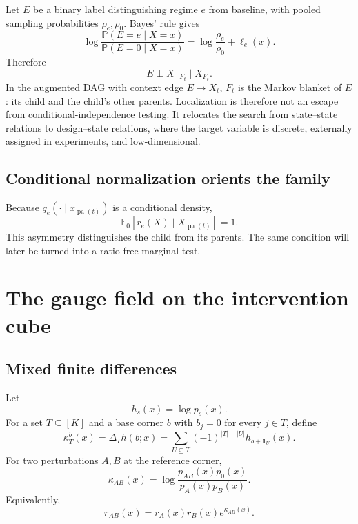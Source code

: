\documentclass[11pt]{article}
\newcommand{\E}{\mathbb{E}}
\newcommand{\Pp}{\mathbb{P}}
\newcommand{\pa}{\operatorname{pa}}
\begin{document}
Let \(E\) be a binary label distinguishing regime \(e\) from baseline, with pooled sampling probabilities \(\rho_e,\rho_0\).  Bayes' rule gives
\begin{equation}
\log\frac{\Pp(E=e\mid X=x)}{\Pp(E=0\mid X=x)}
=
\log\frac{\rho_e}{\rho_0}+\ell_e(x).
\label{eq:classifier-ratio}
\end{equation}
Therefore
\begin{equation}
E\perp X_{-F_t}\mid X_{F_t}.
\label{eq:regime-mb}
\end{equation}
In the augmented DAG with context edge \(E\to X_t\), \(F_t\) is the Markov blanket of \(E\): its child and the child's other parents.  Localization is therefore not an escape from conditional-independence testing.  It relocates the search from state--state relations to design--state relations, where the target variable is discrete, externally assigned in experiments, and low-dimensional.

\subsection{Conditional normalization orients the family}

Because \(q_e(\cdot\mid x_{\pa(t)})\) is a conditional density,
\begin{equation}
\E_0[r_e(X)\mid X_{\pa(t)}]=1.
\label{eq:conditional-normalization}
\end{equation}
This asymmetry distinguishes the child from its parents.  The same condition will later be turned into a ratio-free marginal test.

\section{The gauge field on the intervention cube}

\subsection{Mixed finite differences}

Let
\begin{equation}
h_s(x)=\log p_s(x).
\end{equation}
For a set \(T\subseteq[K]\) and a base corner \(b\) with \(b_j=0\) for every \(j\in T\), define
\begin{equation}
\kappa_T^b(x)
=
\Delta_T h(b;x)
=
\sum_{U\subseteq T}(-1)^{|T|-|U|}h_{b+\mathbf{1}_U}(x).
\label{eq:mobius-curvature}
\end{equation}
For two perturbations \(A,B\) at the reference corner,
\begin{equation}
\boxed{
\kappa_{AB}(x)=
\log\frac{p_{AB}(x)p_0(x)}{p_A(x)p_B(x)}.
}
\label{eq:pair-curvature}
\end{equation}
Equivalently,
\begin{equation}
r_{AB}(x)=r_A(x)r_B(x)e^{\kappa_{AB}(x)}.
\label{eq:curvature-factor}
\end{equation}
\end{document}

